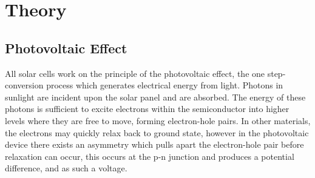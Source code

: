 







\section{Theory}




\subsection{Photovoltaic Effect}

All solar cells work on the principle of the photovoltaic effect, the one step-conversion process which generates electrical energy from light. Photons in sunlight are incident upon the solar panel and are absorbed. The energy of these photons is sufficient to excite electrons within the semiconductor into higher levels where they are free to move, forming electron-hole pairs. In other materials, the electrons may quickly  relax back to ground state, however in the photovoltaic device there exists an asymmetry which pulls apart the electron-hole pair before relaxation can occur, this occurs at the p-n junction and produces a potential difference, and as such a voltage.


